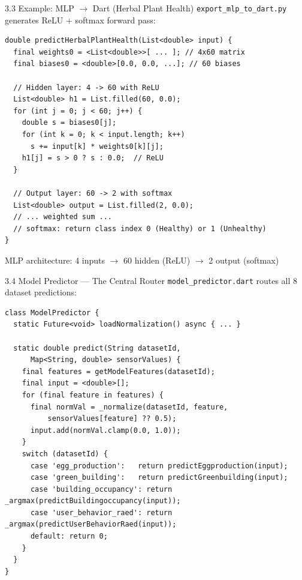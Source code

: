 \documentclass[aspectratio=169]{beamer}
\begin{document}
\begin{frame}{3.3 Example: MLP $\rightarrow$ Dart (Herbal Plant Health)}
  \texttt{export\_mlp\_to\_dart.py} generates ReLU + softmax forward pass:

  \begin{lstlisting}[style=dartstyle,basicstyle=\ttfamily\footnotesize]
double predictHerbalPlantHealth(List<double> input) {
  final weights0 = <List<double>>[ ... ]; // 4x60 matrix
  final biases0 = <double>[0.0, 0.0, ...]; // 60 biases

  // Hidden layer: 4 -> 60 with ReLU
  List<double> h1 = List.filled(60, 0.0);
  for (int j = 0; j < 60; j++) {
    double s = biases0[j];
    for (int k = 0; k < input.length; k++)
      s += input[k] * weights0[k][j];
    h1[j] = s > 0 ? s : 0.0;  // ReLU
  }

  // Output layer: 60 -> 2 with softmax
  List<double> output = List.filled(2, 0.0);
  // ... weighted sum ...
  // softmax: return class index 0 (Healthy) or 1 (Unhealthy)
}
  \end{lstlisting}

  \vspace{0.1cm}
  \small MLP architecture: 4 inputs $\rightarrow$ 60 hidden (ReLU) $\rightarrow$ 2 output (softmax)
\end{frame}

\begin{frame}{3.4 Model Predictor --- The Central Router}
  \texttt{model\_predictor.dart} routes all 8 dataset predictions:

  \vspace{0.1cm}
  \begin{lstlisting}[style=dartstyle,basicstyle=\ttfamily\footnotesize]
class ModelPredictor {
  static Future<void> loadNormalization() async { ... }

  static double predict(String datasetId,
      Map<String, double> sensorValues) {
    final features = getModelFeatures(datasetId);
    final input = <double>[];
    for (final feature in features) {
      final normVal = _normalize(datasetId, feature,
          sensorValues[feature] ?? 0.5);
      input.add(normVal.clamp(0.0, 1.0));
    }
    switch (datasetId) {
      case 'egg_production':   return predictEggproduction(input);
      case 'green_building':   return predictGreenbuilding(input);
      case 'building_occupancy': return _argmax(predictBuildingoccupancy(input));
      case 'user_behavior_raed': return _argmax(predictUserBehaviorRaed(input));
      default: return 0;
    }
  }
}
  \end{lstlisting}
\end{frame}
\end{document}

